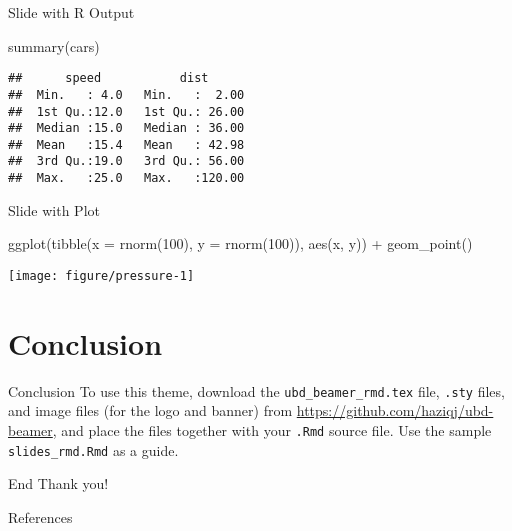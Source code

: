 \documentclass[,aspectratio=43]{beamer}
\newenvironment{Shaded}{\begin{snugshade}}{\end{snugshade}}
\newcommand{\AttributeTok}[1]{\textcolor[rgb]{0.77,0.63,0.00}{#1}}
\newcommand{\DecValTok}[1]{\textcolor[rgb]{0.00,0.00,0.81}{#1}}
\newcommand{\FunctionTok}[1]{\textcolor[rgb]{0.00,0.00,0.00}{#1}}
\newcommand{\NormalTok}[1]{#1}
\newcommand{\SpecialCharTok}[1]{\textcolor[rgb]{0.00,0.00,0.00}{#1}}
\begin{document}
\begin{frame}[fragile]{Slide with R Output}
\protect\hypertarget{slide-with-r-output}{}
\begin{Shaded}
\begin{Highlighting}[]
\FunctionTok{summary}\NormalTok{(cars)}
\end{Highlighting}
\end{Shaded}

\begin{verbatim}
##      speed           dist       
##  Min.   : 4.0   Min.   :  2.00  
##  1st Qu.:12.0   1st Qu.: 26.00  
##  Median :15.0   Median : 36.00  
##  Mean   :15.4   Mean   : 42.98  
##  3rd Qu.:19.0   3rd Qu.: 56.00  
##  Max.   :25.0   Max.   :120.00
\end{verbatim}
\end{frame}

\begin{frame}[fragile]{Slide with Plot}
\protect\hypertarget{slide-with-plot}{}
\begin{Shaded}
\begin{Highlighting}[]
\FunctionTok{ggplot}\NormalTok{(}\FunctionTok{tibble}\NormalTok{(}\AttributeTok{x =} \FunctionTok{rnorm}\NormalTok{(}\DecValTok{100}\NormalTok{), }\AttributeTok{y =} \FunctionTok{rnorm}\NormalTok{(}\DecValTok{100}\NormalTok{)), }\FunctionTok{aes}\NormalTok{(x, y)) }\SpecialCharTok{+}
  \FunctionTok{geom\_point}\NormalTok{()}
\end{Highlighting}
\end{Shaded}

\begin{center}\texttt{[image: figure/pressure-1]} \end{center}
\end{frame}

\hypertarget{conclusion}{%
\section{Conclusion}\label{conclusion}}

\begin{frame}[fragile]{Conclusion}
\protect\hypertarget{conclusion-1}{}
To use this theme, download the \texttt{ubd\_beamer\_rmd.tex} file,
\texttt{.sty} files, and image files (for the logo and banner) from
\url{https://github.com/haziqj/ubd-beamer}, and place the files together
with your \texttt{.Rmd} source file. Use the sample
\texttt{slides\_rmd.Rmd} as a guide.
\end{frame}

\begin{frame}{End}
	\centering
	\Huge
  \textcolor{ubdblue}{Thank you!}
\end{frame}

\begin{frame}{References}
	\printbibliography[heading=none]
\end{frame}
\end{document}
